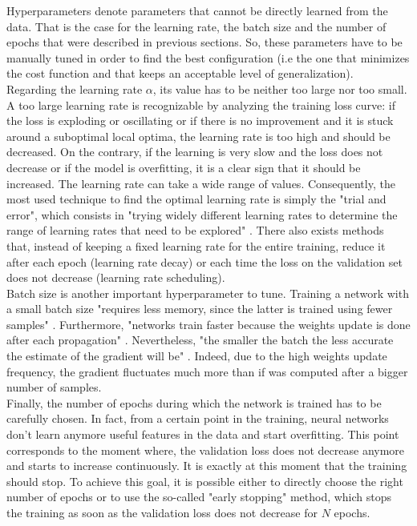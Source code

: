 \setlength{\marginparwidth}{3cm}\leavevmode {}Hyperparameters denote parameters that cannot be directly learned from the data. That is the case for the learning rate, the batch size and the number of epochs that were described in previous sections. So, these parameters have to be manually tuned in order to find the best configuration (i.e the one that minimizes the cost function and that keeps an acceptable level of generalization).\\
Regarding the learning rate $\alpha$, its value has to be neither too large nor too small. A too large learning rate is recognizable by analyzing the training loss curve: if the loss is exploding or oscillating or if there is no improvement and it is stuck around a suboptimal local optima, the learning rate is too high and should be decreased. On the contrary, if the learning is very slow and the loss does not decrease or if the model is overfitting, it is a clear sign that it should be increased.
The learning rate can take a wide range of values. Consequently, the most used technique to find the optimal learning rate is simply the "trial and error", which consists in "trying widely different learning rates to determine the range of learning rates that need to be explored" \cite{28}. There also exists methods that, instead of keeping a fixed learning rate for the entire training, reduce it after each epoch (learning rate decay) or each time the loss on the validation set does not decrease (learning rate scheduling).\\
Batch size is another important hyperparameter to tune. Training a network with a small batch size "requires less memory, since the latter is trained using fewer samples" \cite{29}. Furthermore, "networks train faster because the weights update is done after each propagation" \cite{29}. Nevertheless, "the smaller the batch the less accurate the estimate of the gradient will be" \cite{29}. Indeed, due to the high weights update frequency, the gradient fluctuates much more than if was computed after a bigger number of samples.\\
Finally, the number of epochs during which the network is trained has to be carefully chosen. In fact, from a certain point in the training, neural networks don't learn anymore useful features in the data and start overfitting. This point corresponds to the moment where, the validation loss does not decrease anymore and starts to increase continuously. It is exactly at this moment that the training should stop. To achieve this goal, it is possible either to directly choose the right number of epochs or to use the so-called "early stopping" method, which stops the training as soon as the validation loss does not decrease for $N$ epochs.



